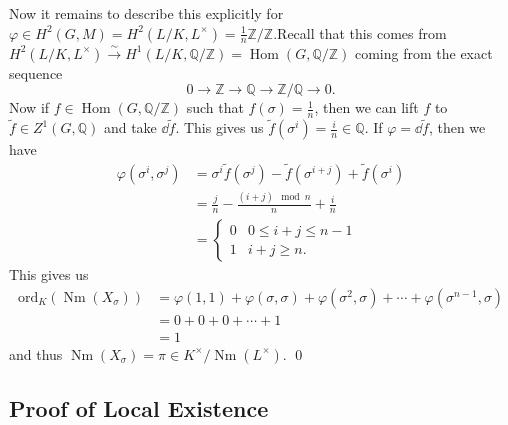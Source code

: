 \documentclass[leqno, openany]{memoir}
\theoremstyle{definition}
\theoremstyle{remark}
\theoremstyle{plain}
\theoremstyle{definition}
\theoremstyle{remark}
\newcommand{\Z}{\mathbb{Z}}
\newcommand{\Q}{\mathbb{Q}}
\newcommand{\mr}[1]{\mathrm{#1}}
\newcommand{\wt}[1]{\widetilde{#1}}
\DeclareMathOperator{\Hom}{Hom}
\DeclareMathOperator{\Nm}{Nm}
\begin{document}
Now it remains to describe this explicitly for $\varphi \in H^2(G, M) = H^2(L/K, L^{\times}) = \frac{1}{n} \Z/\Z$.Recall that this comes from $H^2(L/K, L^{\times}) \xrightarrow{\sim} H^1(L/K, \Q/\Z) = \Hom(G, \Q/\Z)$ coming from the exact sequence
\[ 0 \to \Z \to \Q \to \Z/\Q \to 0. \]
Now if $f \in \Hom(G, \Q/\Z)$ such that $f(\sigma) = \frac{1}{n}$, then we can lift $f$ to $\wt{f} \in Z^1(G, \Q)$ and take $\dd{\wt{f}}$. This gives us $\wt{f}(\sigma^i) = \frac{i}{n} \in \Q$. If $\varphi = \dd{\wt{f}}$, then we have
\begin{align*}
    \varphi(\sigma^i, \sigma^j) &= \sigma^i \wt{f}(\sigma^j)- \wt{f}(\sigma^{i+j}) + \wt{f}(\sigma^i) \\
                                &= \frac{j}{n} - \frac{(i+j) \mod n}{n} + \frac{i}{n} \\
                                &= \begin{cases}
                                    0 & 0 \leq i+j \leq n-1 \\
                                    1 & i+j \geq n.
                                \end{cases}
\end{align*}
This gives us 
\begin{align*}
    \mr{ord}_K(\Nm(X_{\sigma})) &= \varphi(1,1) + \varphi(\sigma, \sigma) + \varphi(\sigma^2, \sigma) + \cdots + \varphi(\sigma^{n-1}, \sigma) \\
                              &= 0 + 0 + 0 + \cdots + 1 \\
                              &= 1
\end{align*}
and thus $\Nm(X_{\sigma}) = \pi \in K^{\times}/\Nm(L^{\times})$. \qed

\subsection{Proof of Local Existence}%
\label{sub:proof_of_local_existence}
\end{document}
